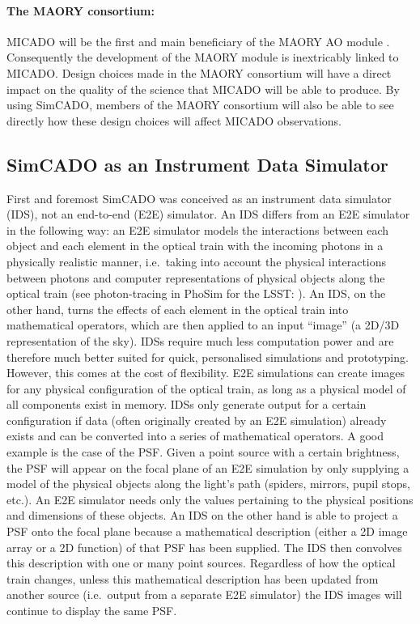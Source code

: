 \paragraph{The MAORY consortium:} MICADO will be the first and main beneficiary of the MAORY AO module \citep{maory}. Consequently the development of the MAORY module is inextricably linked to MICADO. Design choices made in the MAORY consortium will have a direct impact on the quality of the science that MICADO will be able to produce. By using SimCADO, members of the MAORY consortium will also be able to see directly how these design choices will affect MICADO observations.
  



\subsection{SimCADO as an Instrument Data Simulator}
\label{ssec:IDS}

First and foremost SimCADO was conceived as an instrument data simulator (IDS), not an end-to-end (E2E) simulator. An IDS differs from an E2E simulator in the following way: an E2E simulator models the interactions between each object and each element in the optical train with the incoming photons in a physically realistic manner, i.e.\ taking into account the physical interactions between photons and computer representations of physical objects along the optical train (see photon-tracing in PhoSim for the LSST: \citealt{phosim}). An IDS, on the other hand, turns the effects of each element in the optical train into mathematical operators, which are then applied to an input ``image'' (a 2D/3D representation of the sky). IDSs require much less computation power and are therefore much better suited for quick, personalised simulations and prototyping. However, this comes at the cost of flexibility. E2E simulations can create images for any physical configuration of the optical train, as long as a physical model of all components exist in memory. IDSs only generate output for a certain configuration if data (often originally created by an E2E simulation) already exists and can be converted into a series of mathematical operators. A good example is the case of the PSF. Given a point source with a certain brightness, the PSF will appear on the focal plane of an E2E simulation by only supplying a model of the physical objects along the light's path (spiders, mirrors, pupil stops, etc.). An E2E simulator needs only the values pertaining to the physical positions and dimensions of these objects. An IDS on the other hand is able to project a PSF onto the focal plane because a mathematical description (either a 2D image array or a 2D function) of that PSF has been supplied. The IDS then convolves this description with one or many point sources. Regardless of how the optical train changes, unless this mathematical description has been updated from another source (i.e.\ output from a separate E2E simulator) the IDS images will continue to display the same PSF.

